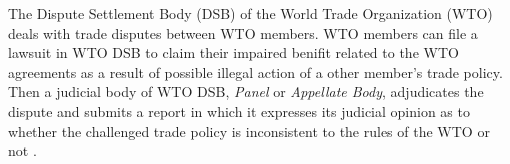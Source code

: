The Dispute Settlement Body (DSB) of 
the World Trade Organization (WTO) deals 
with trade disputes between WTO members.
WTO members can file a lawsuit in WTO DSB to 
claim their impaired benifit related to the WTO agreements as a result of possible illegal action of a other member's trade policy.
Then a judicial body of WTO DSB, \textit{Panel} or \textit{Appellate Body}, %
adjudicates the dispute and submits a report in which it expresses
its judicial opinion as to whether the challenged 
trade policy is inconsistent to the rules of the WTO or not \citep{world2017handbook}.

 

